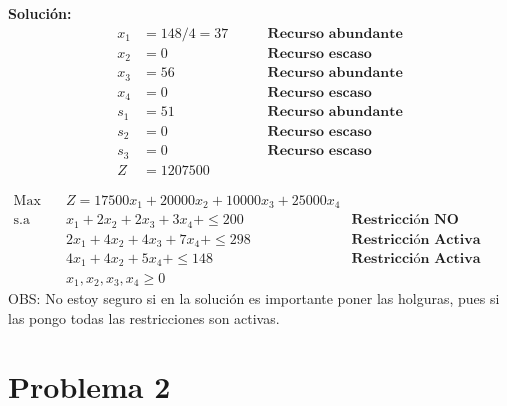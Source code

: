 \documentclass{templateNote}
\begin{document}
\begin{itemize}
    \textbf{Solución:}
    \begin{align*}
        x_1 &= 148/4 = 37 \qquad &\textbf{Recurso abundante} \\
        x_2 &= 0 \qquad &\textbf{Recurso escaso} \\
        x_3 &= 56 \qquad &\textbf{Recurso abundante} \\
        x_4 &= 0 \qquad &\textbf{Recurso escaso} \\
        s_1 &= 51 \qquad &\textbf{Recurso abundante} \\
        s_2 &= 0 \qquad &\textbf{Recurso escaso} \\
        s_3 &= 0 \qquad &\textbf{Recurso escaso} \\
        Z &= 1207500
    \end{align*}

    \begin{equation*}
        \begin{aligned}
            \text{Max} \quad & Z = 17500x_1 + 20000x_2 + 10000x_3 + 25000x_4 \\
            \text{s.a} \quad & x_1 + 2x_2 + 2x_3 + 3x_4 + \leq 200 \qquad &\textbf{Restricci\'on NO Activa} \\
            & 2x_1 + 4x_2 + 4x_3 + 7x_4 + \leq 298 \qquad &\textbf{Restricci\'on Activa} \\
            & 4x_1 + 4x_2 + 5x_4 + \leq 148 \qquad &\textbf{Restricci\'on Activa} \\
            & x_1, x_2, x_3, x_4 \geq 0
        \end{aligned}
    \end{equation*}
OBS: No estoy seguro si en la soluci\'on es importante poner las holguras, pues si las pongo todas las restricciones son activas.
\end{itemize}

\newpage
\section*{Problema 2}
\end{document}

